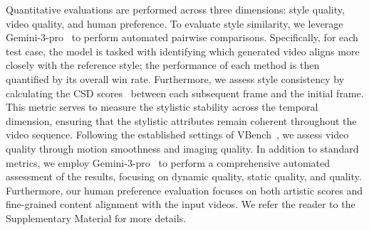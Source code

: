 \documentclass[runningheads]{llncs}
\begin{document}
Quantitative evaluations are performed across three dimensions: style quality, video quality, and human preference. 
To evaluate style similarity, we leverage Gemini-3-pro~\cite{team2023gemini} to perform automated pairwise comparisons. Specifically, for each test case, the model is tasked with identifying which generated video aligns more closely with the reference style; the performance of each method is then quantified by its overall win rate. 
Furthermore, we assess style consistency by calculating the CSD scores~\cite{csd} between each subsequent frame and the initial frame. This metric serves to measure the stylistic stability across the temporal dimension, ensuring that the stylistic attributes remain coherent throughout the video sequence.
Following the established settings of VBench~\cite{huang2024vbench}, we assess video quality through motion smoothness and imaging quality. In addition to standard metrics, we employ Gemini-3-pro~\cite{team2023gemini} to perform a comprehensive automated assessment of the results, focusing on dynamic quality, static quality, and quality. Furthermore, our human preference evaluation focuses on both artistic scores and fine-grained content alignment with the input videos. We refer the reader to the Supplementary Material for more details.
\end{document}
